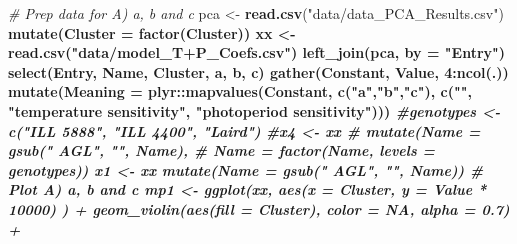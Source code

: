 \documentclass[
]{article}
\newenvironment{Shaded}{\begin{snugshade}}{\end{snugshade}}
\newcommand{\CommentTok}[1]{\textcolor[rgb]{0.56,0.35,0.01}{\textit{#1}}}
\newcommand{\DataTypeTok}[1]{\textcolor[rgb]{0.13,0.29,0.53}{#1}}
\newcommand{\DecValTok}[1]{\textcolor[rgb]{0.00,0.00,0.81}{#1}}
\newcommand{\FloatTok}[1]{\textcolor[rgb]{0.00,0.00,0.81}{#1}}
\newcommand{\KeywordTok}[1]{\textcolor[rgb]{0.13,0.29,0.53}{\textbf{#1}}}
\newcommand{\NormalTok}[1]{#1}
\newcommand{\OperatorTok}[1]{\textcolor[rgb]{0.81,0.36,0.00}{\textbf{#1}}}
\newcommand{\OtherTok}[1]{\textcolor[rgb]{0.56,0.35,0.01}{#1}}
\newcommand{\StringTok}[1]{\textcolor[rgb]{0.31,0.60,0.02}{#1}}
\begin{document}
\begin{Shaded}
\begin{Highlighting}[]
\CommentTok{# Prep data for A) a, b and c}
\NormalTok{pca <-}\StringTok{ }\KeywordTok{read.csv}\NormalTok{(}\StringTok{"data/data_PCA_Results.csv"}\NormalTok{) }\OperatorTok{%
\StringTok{  }\KeywordTok{mutate}\NormalTok{(}\DataTypeTok{Cluster =} \KeywordTok{factor}\NormalTok{(Cluster))}
\NormalTok{xx <-}\StringTok{ }\KeywordTok{read.csv}\NormalTok{(}\StringTok{"data/model_T+P_Coefs.csv"}\NormalTok{) }\OperatorTok{%
\StringTok{  }\KeywordTok{left_join}\NormalTok{(pca, }\DataTypeTok{by =} \StringTok{"Entry"}\NormalTok{) }\OperatorTok{%
\StringTok{  }\KeywordTok{select}\NormalTok{(Entry, Name, Cluster, a, b, c) }\OperatorTok{%
\StringTok{  }\KeywordTok{gather}\NormalTok{(Constant, Value, }\DecValTok{4}\OperatorTok{:}\KeywordTok{ncol}\NormalTok{(.)) }\OperatorTok{%
\StringTok{  }\KeywordTok{mutate}\NormalTok{(}\DataTypeTok{Meaning =}\NormalTok{ plyr}\OperatorTok{::}\KeywordTok{mapvalues}\NormalTok{(Constant, }\KeywordTok{c}\NormalTok{(}\StringTok{"a"}\NormalTok{,}\StringTok{"b"}\NormalTok{,}\StringTok{"c"}\NormalTok{),}
           \KeywordTok{c}\NormalTok{(}\StringTok{""}\NormalTok{, }\StringTok{"temperature sensitivity"}\NormalTok{, }\StringTok{"photoperiod sensitivity"}\NormalTok{)))}
\CommentTok{#genotypes <- c("ILL 5888", "ILL 4400", "Laird")}
\CommentTok{#x4 <- xx %
\CommentTok{#  mutate(Name = gsub(" AGL", "", Name),}
\CommentTok{#         Name = factor(Name, levels = genotypes))}
\NormalTok{x1 <-}\StringTok{ }\NormalTok{xx }\OperatorTok{%
\StringTok{  }\KeywordTok{mutate}\NormalTok{(}\DataTypeTok{Name =} \KeywordTok{gsub}\NormalTok{(}\StringTok{" AGL"}\NormalTok{, }\StringTok{""}\NormalTok{, Name))}
\CommentTok{# Plot A) a, b and c}
\NormalTok{mp1 <-}\StringTok{ }\KeywordTok{ggplot}\NormalTok{(xx, }\KeywordTok{aes}\NormalTok{(}\DataTypeTok{x =}\NormalTok{ Cluster, }\DataTypeTok{y =}\NormalTok{ Value }\OperatorTok{*}\StringTok{ }\DecValTok{10000}\NormalTok{) ) }\OperatorTok{+}\StringTok{ }
\StringTok{  }\KeywordTok{geom_violin}\NormalTok{(}\KeywordTok{aes}\NormalTok{(}\DataTypeTok{fill =}\NormalTok{ Cluster), }\DataTypeTok{color =} \OtherTok{NA}\NormalTok{, }\DataTypeTok{alpha =} \FloatTok{0.7}\NormalTok{) }\OperatorTok{+}\StringTok{ }
}}}}}}}
\end{Highlighting}
\end{Shaded}
\end{document}
